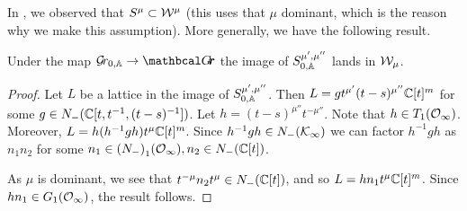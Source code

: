 \documentclass[draft]{article} %
\begin{document}
In \cite[Prop~2.6]{kamnitzer2014yangians}, we observed that $ S^\mu \subset \cW^\mu$ (this uses that $\mu$ dominant, which is the reason why we make this assumption).  More generally, we have the following result.


\begin{lemma}
\label{le:inftyfusiskl} %
    Under the map $ \Grbd \rightarrow \Grth$ the image of $ S^{\mu', \mu''}_{0,\AA}$ lands in $ \cW_\mu$.
\end{lemma}

\begin{proof}
    Let $ L $ 
    be a lattice in the image of $S^{\mu',\mu''}_{0,\AA}$. Then $ L = g t^{\mu'} (t-s)^{\mu''}\CC[t]^m$ for some $ g \in N_-(\CC[t, t^{-1}, (t-s)^{-1}]) $.  Let $ h =(t-s)^{\mu''} t^{-\mu''}  $.  Note that $ h \in T_1(\Oinf)$. 
    Moreover, $L = h (h^{-1} g h) t^{\mu}\CC[t]^m$. 
    Since 
    $h^{-1} g h \in N_-(\cK_\infty)$ we can factor $ h^{-1} g h$ as $n_1 n_2$ for some $ n_1 \in {(N_-)}_1(\Oinf), n_2 \in {N_-}(\CC[t]) $. 
    
    As $ \mu $ is dominant, we see that $ t^{-\mu} n_2 t^\mu \in N_-(\CC[t]) $, and so 
    $ L = h n_1 t^\mu \CC[t]^m$.  Since $ hn_1 \in G_1(\Oinf)$, the result follows. %
\end{proof}

% 
\end{document}
